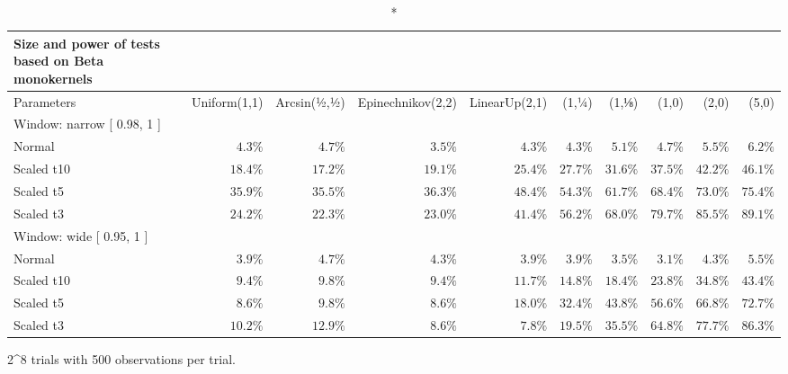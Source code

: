 \setlength{\LTpost}{0mm}
\begin{longtable}{lrrrrrrrrr}
\caption*{
{\large Size and power of tests based on Beta monokernels}
} \\ 
\toprule
Parameters & Uniform(1,1) & Arcsin(½,½) & Epinechnikov(2,2) & LinearUp(2,1) & (1,¼) & (1,⅛) & (1,0) & (2,0) & (5,0) \\ 
\midrule
\multicolumn{10}{l}{Window:  narrow  [ 0.98, 1 ]} \\ 
\midrule
Normal & $4.3\%$ & $4.7\%$ & $3.5\%$ & $4.3\%$ & $4.3\%$ & $5.1\%$ & $4.7\%$ & $5.5\%$ & $6.2\%$ \\ 
Scaled t10 & $18.4\%$ & $17.2\%$ & $19.1\%$ & $25.4\%$ & $27.7\%$ & $31.6\%$ & $37.5\%$ & $42.2\%$ & $46.1\%$ \\ 
Scaled t5 & $35.9\%$ & $35.5\%$ & $36.3\%$ & $48.4\%$ & $54.3\%$ & $61.7\%$ & $68.4\%$ & $73.0\%$ & $75.4\%$ \\ 
Scaled t3 & $24.2\%$ & $22.3\%$ & $23.0\%$ & $41.4\%$ & $56.2\%$ & $68.0\%$ & $79.7\%$ & $85.5\%$ & $89.1\%$ \\ 
\midrule
\multicolumn{10}{l}{Window:  wide  [ 0.95, 1 ]} \\ 
\midrule
Normal & $3.9\%$ & $4.7\%$ & $4.3\%$ & $3.9\%$ & $3.9\%$ & $3.5\%$ & $3.1\%$ & $4.3\%$ & $5.5\%$ \\ 
Scaled t10 & $9.4\%$ & $9.8\%$ & $9.4\%$ & $11.7\%$ & $14.8\%$ & $18.4\%$ & $23.8\%$ & $34.8\%$ & $43.4\%$ \\ 
Scaled t5 & $8.6\%$ & $9.8\%$ & $8.6\%$ & $18.0\%$ & $32.4\%$ & $43.8\%$ & $56.6\%$ & $66.8\%$ & $72.7\%$ \\ 
Scaled t3 & $10.2\%$ & $12.9\%$ & $8.6\%$ & $7.8\%$ & $19.5\%$ & $35.5\%$ & $64.8\%$ & $77.7\%$ & $86.3\%$ \\ 
\bottomrule
\end{longtable}
\begin{minipage}{\linewidth}
2\textasciicircum{}8 trials with 500 observations per trial.\\
\end{minipage}

